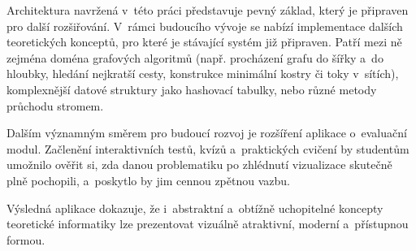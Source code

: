 \pagebreak
Architektura navržená v~této práci představuje pevný základ, který je připraven pro další rozšiřování.
V~rámci budoucího vývoje se nabízí implementace dalších teoretických konceptů, pro které je stávající systém již připraven.
Patří mezi ně zejména doména grafových algoritmů (např. procházení grafu do šířky a~do hloubky, hledání nejkratší cesty, konstrukce minimální kostry či toky v~sítích), komplexnější datové struktury jako hashovací tabulky, nebo různé metody průchodu stromem.

Dalším významným směrem pro budoucí rozvoj je rozšíření aplikace o~evaluační modul.
Začlenění interaktivních testů, kvízů a~praktických cvičení by studentům umožnilo ověřit si, zda danou problematiku po zhlédnutí vizualizace skutečně plně pochopili, a~poskytlo by jim cennou zpětnou vazbu.

Výsledná aplikace dokazuje, že i~abstraktní a~obtížně uchopitelné koncepty teoretické informatiky lze prezentovat vizuálně atraktivní, moderní a~přístupnou formou.
